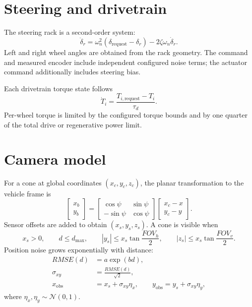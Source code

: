 \documentclass[11pt,a4paper]{article}
\newcommand{\Normal}{\mathcal{N}}
\begin{document}
\section{Steering and drivetrain}

The steering rack is a second-order system:
\begin{equation}
  \ddot\delta_r=
  \omega_n^2(\delta_{\mathrm{request}}-\delta_r)
  -2\zeta\omega_n\dot\delta_r.
\end{equation}
Left and right wheel angles are obtained from the rack geometry. The command
and measured encoder include independent configured noise terms; the actuator
command additionally includes steering bias.

Each drivetrain torque state follows
\begin{equation}
  \dot T_i=\frac{T_{i,\mathrm{request}}-T_i}{\tau_d}.
\end{equation}
Per-wheel torque is limited by the configured torque bounds and by one quarter
of the total drive or regenerative power limit.

\section{Camera model}

For a cone at global coordinates \((x_c,y_c,z_c)\), the planar transformation
to the vehicle frame is
\begin{equation}
  \begin{bmatrix}x_b\\y_b\end{bmatrix}
  =
  \begin{bmatrix}
  \cos\psi&\sin\psi\\
  -\sin\psi&\cos\psi
  \end{bmatrix}
  \begin{bmatrix}x_c-x\\y_c-y\end{bmatrix}.
\end{equation}
Sensor offsets are added to obtain \((x_s,y_s,z_s)\). A cone is visible when
\begin{equation}
  x_s>0,\qquad d\leq d_{\max},\qquad
  |y_s|\leq x_s\tan\frac{FOV_h}{2},\qquad
  |z_s|\leq x_s\tan\frac{FOV_v}{2}.
\end{equation}
Position noise grows exponentially with distance:
\begin{align}
  RMSE(d)&=a\exp(bd),\\
  \sigma_{xy}&=\frac{RMSE(d)}{\sqrt2},\\
  x_{\mathrm{obs}}&=x_s+\sigma_{xy}\eta_x,\qquad
  y_{\mathrm{obs}}=y_s+\sigma_{xy}\eta_y,
\end{align}
where \(\eta_x,\eta_y\sim\Normal(0,1)\).
\end{document}
